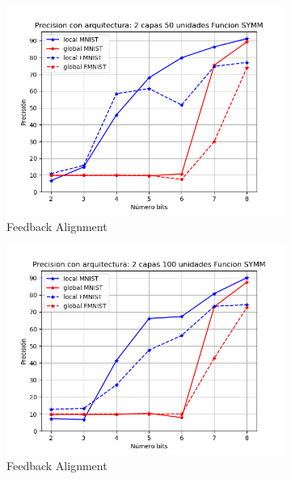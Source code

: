 \begin{figure}[H]
\begin{subfigure}[H]{0.475\textwidth}
    \includegraphics[width=\textwidth]{imagenes/fa/Precision con arquitectura: 2 capas 50 unidades Funcion SYMM.png}
    \caption{Feedback Alignment}
    \end{subfigure}
    \begin{subfigure}[H]{0.475\textwidth}
    \includegraphics[width=\textwidth]{imagenes/fa/Precision con arquitectura: 2 capas 100 unidades Funcion SYMM.png}
    \caption{Feedback Alignment}
    \end{subfigure}
    \begin{subfigure}[H]{0.475\textwidth}

\end{subfigure}
\end{figure}
